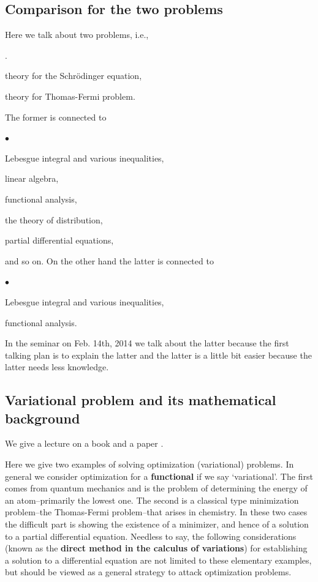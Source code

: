 \documentclass[openany, a4paper, oneside]{jsbook}
\newcounter{enum2}
\renewenvironment{enumerate}{%
\begin{list}%
{%
\arabic{enum2}.\ \,%
}%
{%
\usecounter{enum2}
\setlength{\itemindent}{0pt}%
\setlength{\leftmargin}{15pt}%
\setlength{\rightmargin}{0pt}%
\setlength{\labelsep}{0pt}%
\setlength{\labelwidth}{6pt}%
\setlength{\itemsep}{0pt}%
\setlength{\parsep}{0pt}%
\setlength{\listparindent}{0pt}%
}
}{%
\end{list}%
}
\renewenvironment{itemize}{%
\begin{list}{$\bullet$\ \ }%
{%
\usecounter{enum2}
\setlength{\itemindent}{0pt}%
\setlength{\leftmargin}{15pt}%
\setlength{\rightmargin}{0pt}%
\setlength{\labelsep}{0pt}%
\setlength{\labelwidth}{6pt}%
\setlength{\itemsep}{0pt}%
\setlength{\parsep}{0pt}%
\setlength{\listparindent}{0pt}%
}
}{%
\end{list}%
}
\theoremstyle{break}
\theoremstyle{breakdefn}
\begin{document}
\subsection{Comparison for the two problems}


Here we talk about two problems, i.e.,
\begin{enumerate}
\item theory for the Schr\"odinger equation,
\item theory for Thomas-Fermi problem.
\end{enumerate}
The former is connected to
\begin{itemize}
\item Lebesgue integral and various inequalities,
\item linear algebra,
\item functional analysis,
\item the theory of distribution,
\item partial differential equations,
\end{itemize}
and so on.
On the other hand the latter is connected to
\begin{itemize}
\item Lebesgue integral and various inequalities,
\item functional analysis.
\end{itemize}
In the seminar on Feb. 14th, 2014  we talk about the latter because
the first talking plan is to explain the latter and the latter is a little bit easier
because the latter needs less knowledge.
\subsection{Variational problem and its mathematical background}


We give a lecture on a book \cite{LiebLoss1} and a paper \cite{LiebSimon1}.

Here we give two examples of solving optimization (variational) problems.
In general we consider optimization for a \textbf{functional} if we say `variational'.
The first comes from quantum mechanics and is the problem of determining the energy of an atom--primarily the lowest one.
The second is a classical type minimization problem--the Thomas-Fermi problem--that arises in chemistry.
In these two cases the difficult part is showing the existence of a minimizer, and hence of a solution
to a partial differential equation.
Needless to say, the following considerations (known as the \textbf{direct method in the calculus of variations})
for establishing a solution to a differential equation are not limited to these elementary examples,
but should be viewed as a general strategy to attack optimization problems.
\end{document}
